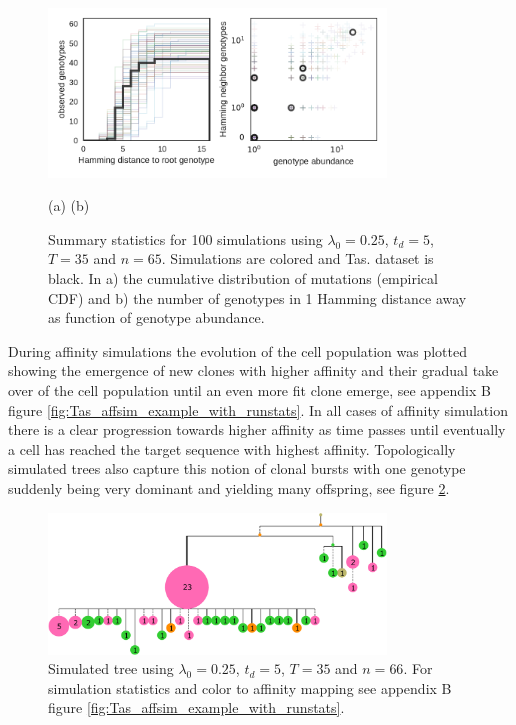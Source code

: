 \begin{figure}
    \begin{center}
    \includegraphics[width=0.8\textwidth]{figures/Tas-affsim_Tas-data.pdf}\newline%
    \end{center}
    \vspace{-14mm} \hspace{42mm} (a) \hspace{52mm} (b)
    \caption{
        \label{fig:Tas-affsim_Tas-data}
        Summary statistics for 100 simulations using $\lambda_0=0.25$, $t_d=5$, $T=35$ and $n=65$.
        Simulations are colored and Tas. dataset is black.
        In a) the cumulative distribution of mutations (empirical CDF) and b) the number of genotypes in 1 Hamming distance away as function of genotype abundance.
    }
\end{figure}


During affinity simulations the evolution of the cell population was plotted showing the emergence of new clones with higher affinity and their gradual take over of the cell population until an even more fit clone emerge, see appendix B figure \ref{fig:Tas_affsim_example_with_runstats}.
In all cases of affinity simulation there is a clear progression towards higher affinity as time passes until eventually a cell has reached the target sequence with highest affinity.
Topologically simulated trees also capture this notion of clonal bursts with one genotype suddenly being very dominant and yielding many offspring, see figure \ref{fig:Tas_affsim_example.collapsed_runstat_color_tree}.

\begin{figure}
    \centering
    \includegraphics[width=0.8\textwidth]{figures/Tas_affsim_example_collapsed_runstat_color_tree.pdf}
    \caption{
        \label{fig:Tas_affsim_example.collapsed_runstat_color_tree}
        Simulated tree using $\lambda_0=0.25$, $t_d=5$, $T=35$ and $n=66$.
        For simulation statistics and color to affinity mapping see appendix B figure \ref{fig:Tas_affsim_example_with_runstats}.
    }
\end{figure}





